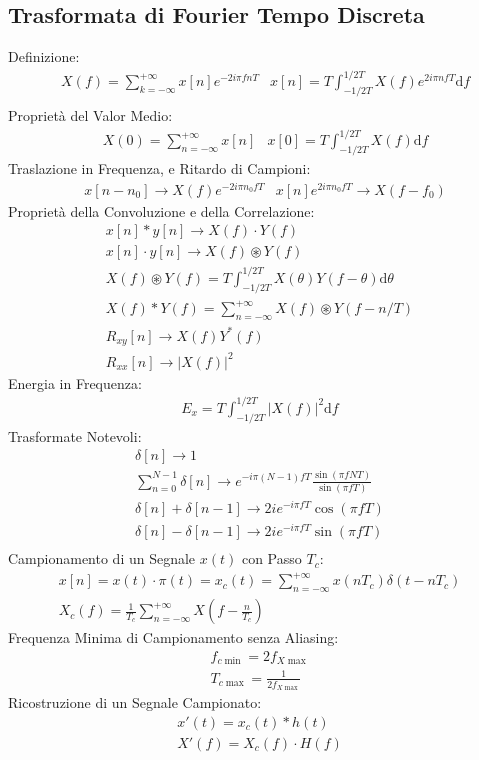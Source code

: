\documentclass{article}
\newcommand{\df}{\mathrm{d}}
\newcommand{\suminf}{\displaystyle\sum_{n=-\infty}^{+\infty}}
\newcommand{\suminfk}{\displaystyle\sum_{k=-\infty}^{+\infty}}
\begin{document}
\subsection*{Trasformata di Fourier Tempo Discreta}
Definizione:
\begin{align*}
    &X(f)=\suminfk x[n]e^{-2i\pi fnT}
    &x[n]=T\displaystyle\int_{-1/2T}^{1/2T}X(f)e^{2i\pi nfT}\df f\\
\end{align*}
Proprietà del Valor Medio:
\begin{align*}
    &X(0)=\suminf x[n]
    &x[0]=T\displaystyle\int_{-1/2T}^{1/2T} X(f)\df f
\end{align*}
Traslazione in Frequenza, e Ritardo di Campioni:
\begin{align*}
    &x[n-n_0]\to X(f)e^{-2i\pi n_0fT}
    &x[n]e^{2i\pi n_0fT}\to X(f-f_0)
\end{align*}
Proprietà della Convoluzione e della Correlazione: 
\begin{gather*}
    x[n]*y[n]\to X(f)\cdot Y(f)\\
    x[n]\cdot y[n]\to X(f)\circledast Y(f)\\
    X(f)\circledast Y(f)=T\displaystyle\int_{-1/2T}^{1/2T}X(\theta)Y(f-\theta)\df\theta\\
    X(f)*Y(f)=\suminf X(f)\circledast Y(f-n/T)\\
    R_{xy}[n]\to X(f)Y^*(f)\\
    R_{xx}[n]\to|X(f)|^2
\end{gather*}
Energia in Frequenza:
\begin{gather*}
    E_x=T\displaystyle\int_{-1/2T}^{1/2T}|X(f)|^2\df f
\end{gather*}
Trasformate Notevoli:
\begin{gather*}
    \delta[n]\to 1\\
    \displaystyle\sum_{n=0}^{N-1}\delta[n]\to e^{-i\pi(N-1)fT}\frac{\sin(\pi fNT)}{\sin(\pi fT)}\\
    \delta[n]+\delta[n-1]\to2ie^{-i\pi fT}\cos(\pi fT)\\
    \delta[n]-\delta[n-1]\to2ie^{-i\pi fT}\sin(\pi fT)\\
\end{gather*}
Campionamento di un Segnale $x(t)$ con Passo $T_c$:
\begin{gather*}
    x[n]=x(t)\cdot\pi(t)=x_c(t)=\suminf x(nT_c)\delta(t-nT_c)\\
    X_c(f)=\displaystyle\frac{1}{T_c}\suminf X\left(f-\frac{n}{T_c}\right)
\end{gather*}
Frequenza Minima di Campionamento senza Aliasing:
\begin{gather*}
    f_{c\min}=2f_{X\max}\\
    T_{c\max}=\displaystyle\frac{1}{2f_{X\max}}
\end{gather*}
Ricostruzione di un Segnale Campionato:
\begin{gather*}
    x'(t)=x_c(t)*h(t)\\
    X'(f)=X_c(f)\cdot H(f)
\end{gather*}
\end{document}
